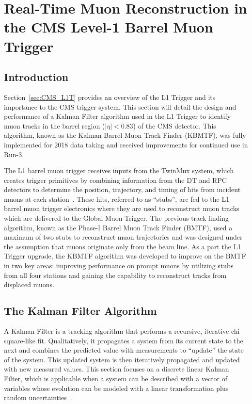 
\chapter{Real-Time Muon Reconstruction in the CMS Level-1 Barrel Muon Trigger}
\label{chap:kbmtf}

\section{Introduction} \label{sec:kbmtf_intro}
Section~\ref{sec:CMS_L1T} provides an overview of the L1 Trigger and its importance to the CMS trigger system. This section will detail the design and performance of a Kalman Filter algorithm used in the L1 Trigger to identify muon tracks in the barrel region ($|\eta|<0.83$) of the CMS detector. This algorithm, known as the Kalman Barrel Muon Track Finder (KBMTF), was fully implemented for 2018 data taking and received improvements for continued use in Run-3.

The L1 barrel muon trigger receives inputs from the TwinMux system, which creates trigger primitives by combining information from the DT and RPC detectors to determine the position, trajectory, and timing of hits from incident muons at each station~\cite{Triossi_2017}. These hits, referred to as ``stubs'', are fed to the L1 barrel muon trigger electronics where they are used to reconstruct muon tracks which are delivered to the Global Muon Trigger. The previous track finding algorithm, known as the Phase-I Barrel Muon Track Finder (BMTF), used a maximum of two stubs to reconstruct muon trajectories and was designed under the assumption that muons originate only from the beam line. As a part the L1 Trigger upgrade, the KBMTF algorithm was developed to improve on the BMTF in two key areas: improving performance on prompt muons by utilizing stubs from all four stations and gaining the capability to reconstruct tracks from displaced muons.

\section{The Kalman Filter Algorithm} \label{sec:kalman_filter}
A Kalman Filter is a tracking algorithm that performs a recursive, iterative chi-square-like fit. Qualitatively, it propagates a system from its current state to the next and combines the predicted value with measurements to ``update'' the state of the system. This updated system is then iteratively propagated and updated with new measured values. This section focuses on a discrete linear Kalman Filter, which is applicable when a system can be described with a vector of variables whose evolution can be modeled with a linear transformation plus random uncertainties~\cite{FRUHWIRTH1987444}.

